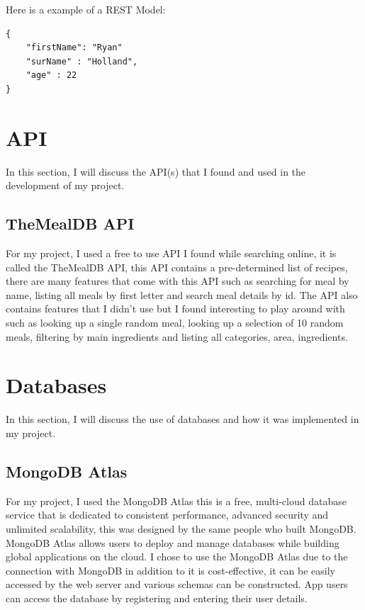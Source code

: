 Here is a example of a REST Model:

\begin{verbatim}
{     
    "firstName": "Ryan"
    "surName" : "Holland",
    "age" : 22
}
\end{verbatim}

\section{API}

In this section, I will discuss the API(s) that I found and used in the development of my project.

\subsection{TheMealDB API}

For my project, I used a free to use API I found while searching online, it is called the TheMealDB API, this API contains a pre-determined list of recipes, there are many features that come with this API such as searching for meal by name, listing all meals by first letter and search meal details by id. The API also contains features that I didn't use but I found interesting to play around with such as looking up a single random meal, looking up a selection of 10 random meals, filtering by main ingredients and listing all categories, area, ingredients.

\section{Databases}

In this section, I will discuss the use of databases and how it was implemented in my project.

\subsection{MongoDB Atlas}

For my project, I used the MongoDB Atlas this is a free, multi-cloud database service that is dedicated to consistent performance, advanced security and unlimited scalability, this was designed by the same people who built MongoDB. MongoDB Atlas allows users to deploy and manage databases while building global applications on the cloud. I chose to use the MongoDB Atlas due to the connection with MongoDB in addition to it is cost-effective, it can be easily accessed by the web server and various schemas can be constructed. App users can access the database by registering and entering their user details.

